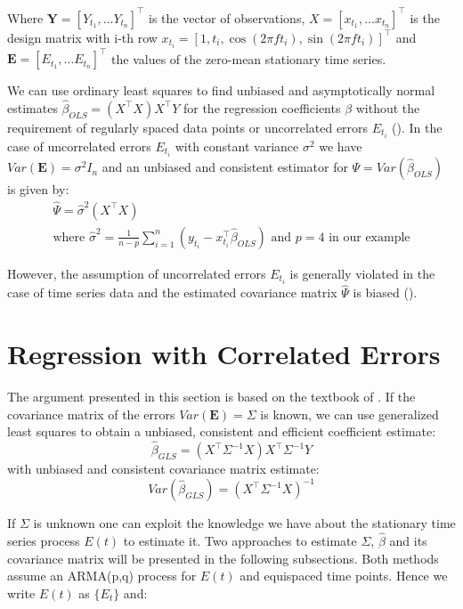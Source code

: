 Where $\mathbf{Y} = [Y_{t_1}, \dots Y_{t_n}]^{\top}$ is the vector of observations,
$X = [x_{t_1}, \dots x_{t_n}]^{\top}$ is the design matrix with i-th row
$x_{t_i} = [1, t_i, \cos(2 \pi f t_i), \sin(2 \pi f t_i)]^{\top}$
and $\mathbf{E} = [E_{t_1}, \dots E_{t_n}]^{\top}$ the values of the zero-mean stationary time series.

We can use ordinary least squares to find unbiased and asymptotically normal estimates $\hat{\beta}_{OLS} = (X^{\top}X) X^{\top}Y$
for the regression coefficients $\beta$ without the requirement of regularly spaced data points or uncorrelated errors
$E_{t_i}$ (\citeauthor{white_asymptotic_2001}).
In the case of uncorrelated errors $E_{t_i}$ with constant variance $\sigma^2$ we have
$Var(\mathbf{E}) = \sigma^2 I_n$ and an unbiased and consistent estimator for $\Psi = Var(\hat{\beta}_{OLS})$ is given by:
\begin{gather*}
\hat{\Psi} = \hat{\sigma}^2(X^{\top}X) \\
    \text{where $\hat{\sigma}^2=\frac{1}{n-p} \sum_{i = 1}^{n} (y_{t_i} - x_{t_i}^{\top} \hat{\beta}_{OLS})$ and $p=4$ in our example}
\end{gather*}

However, the assumption of uncorrelated errors $E_{t_i}$ is generally violated in the case of time series data and the
estimated covariance matrix $\hat{\Psi}$ is biased (\citeauthor{brockwell_introduction_2016}).

\section{Regression with Correlated Errors}

The argument presented in this section is based on the textbook of \citeauthor{brockwell_introduction_2016}.
If the covariance matrix of the errors $Var(\mathbf{E}) = \Sigma$ is known,
we can use generalized least squares to obtain a unbiased, consistent and efficient coefficient estimate:
\[\hat{\beta}_{GLS} = (X^{\top} \Sigma^{-1} X) X^{\top} \Sigma^{-1} Y\]
with unbiased and consistent covariance matrix estimate:
\[Var(\hat{\beta}_{GLS}) = (X^{\top} \Sigma^{-1} X)^{-1}\]

If $\Sigma$ is unknown one can exploit the knowledge we have about the stationary time series process $E(t)$ to estimate it.
Two approaches to estimate $\Sigma$, $\hat \beta $ and its covariance matrix will be presented in the following subsections.
Both methods assume an ARMA(p,q) process for $E(t)$ and equispaced time points. Hence we write $E(t)$ as $\{E_t\}$ and:

